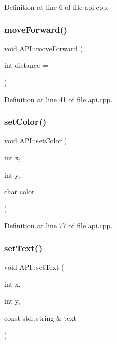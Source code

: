 Definition at line 6 of file api.\+cpp.

\mbox{\label{class_a_p_i_a25ace37c644938df32f6dae69abfe052}} 
\subsubsection{\texorpdfstring{move\+Forward()}{moveForward()}}
{\footnotesize\ttfamily void A\+P\+I\+::move\+Forward (\begin{DoxyParamCaption}\item[{int}]{distance = {} }\end{DoxyParamCaption})\hspace{0.3cm}{\ttfamily [static]}}



Definition at line 41 of file api.\+cpp.

\mbox{\label{class_a_p_i_aee5aaa673b406ddaab3310fcb3a51d83}} 
\subsubsection{\texorpdfstring{set\+Color()}{setColor()}}
{\footnotesize\ttfamily void A\+P\+I\+::set\+Color (\begin{DoxyParamCaption}\item[{int}]{x,  }\item[{int}]{y,  }\item[{char}]{color }\end{DoxyParamCaption})\hspace{0.3cm}{\ttfamily [static]}}



Definition at line 77 of file api.\+cpp.

\mbox{\label{class_a_p_i_a25a489520b0b69b7a0b1870cf350f654}} 
\subsubsection{\texorpdfstring{set\+Text()}{setText()}}
{\footnotesize\ttfamily void A\+P\+I\+::set\+Text (\begin{DoxyParamCaption}\item[{int}]{x,  }\item[{int}]{y,  }\item[{const std\+::string \&}]{text }\end{DoxyParamCaption})\hspace{0.3cm}{\ttfamily [static]}}



